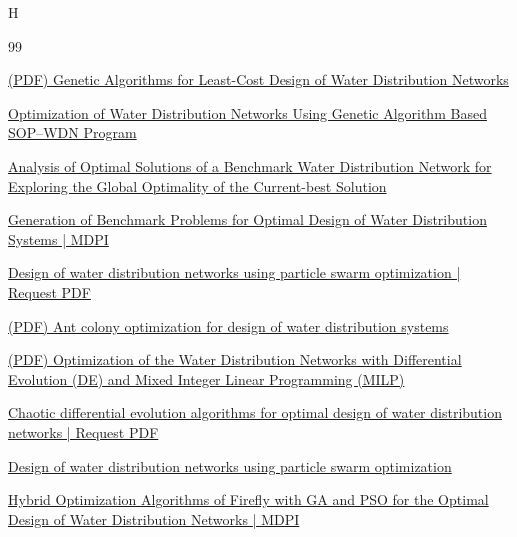 H\documentclass[12pt, a4paper]{article}
\begin{document}
\begin{thebibliography}{99}

 \href{https://www.researchgate.net/publication/235694770_Genetic_Algorithms_for_Least-Cost_Design_of_Water_Distribution_Networks}{(PDF) Genetic Algorithms for Least-Cost Design of Water Distribution Networks}

 \href{https://www.mdpi.com/2073-4441/14/6/851}{Optimization of Water Distribution Networks Using Genetic Algorithm Based SOP--WDN Program}

 \href{https://chijournal.org/H527}{Analysis of Optimal Solutions of a Benchmark Water Distribution Network for Exploring the Global Optimality of the Current-best Solution}

 \href{https://www.mdpi.com/2073-4441/11/8/1637}{Generation of Benchmark Problems for Optimal Design of Water Distribution Systems | MDPI}

 \href{https://www.researchgate.net/publication/263555074_Design_of_water_distribution_networks_using_particle_swarm_optimization}{Design of water distribution networks using particle swarm optimization | Request PDF}

 \href{https://www.researchgate.net/publication/270396349_Ant_colony_optimization_for_design_of_water_distribution_systems}{(PDF) Ant colony optimization for design of water distribution systems}

 \href{https://www.researchgate.net/publication/280095752_Optimization_of_the_Water_Distribution_Networks_with_Differential_Evolution_DE_and_Mixed_Integer_Linear_Programming_MILP}{(PDF) Optimization of the Water Distribution Networks with Differential Evolution (DE) and Mixed Integer Linear Programming (MILP)}

 \href{https://www.researchgate.net/publication/364837949_Chaotic_differential_evolution_algorithms_for_optimal_design_of_water_distribution_networks}{Chaotic differential evolution algorithms for optimal design of water distribution networks | Request PDF}

 \href{https://www.researchgate.net/publication/263555074_Design_of_water_distribution_networks_using_particle_swarm_optimization}{Design of water distribution networks using particle swarm optimization} 

 \href{https://www.mdpi.com/2073-4441/15/10/1906}{Hybrid Optimization Algorithms of Firefly with GA and PSO for the Optimal Design of Water Distribution Networks | MDPI}


\end{thebibliography}
\end{document}

